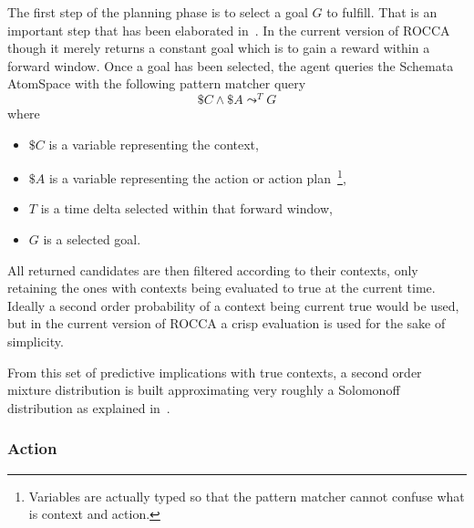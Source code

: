 \documentclass[runningheads]{llncs}
\newcommand{\lpreimp}[1]{\leadsto^{#1}}
\begin{document}
The first step of the planning phase is to select a goal $G$ to
fulfill.  That is an important step that has been elaborated
in~\cite{Goertzel2014EGI1, Hahm2021}.  In the current version of ROCCA
though it merely returns a constant goal which is to gain a reward
within a forward window.  Once a goal has been selected, the agent
queries the Schemata AtomSpace with the following pattern matcher
query
$$\$C \land \$A \lpreimp{T} G$$
where
\begin{itemize}
\item $\$C$ is a variable representing the context,
\item $\$A$ is a variable representing the action or action
  plan~\footnote{Variables are actually typed so that the pattern
    matcher cannot confuse what is context and action.},
\item $T$ is a time delta selected within that forward window,
\item $G$ is a selected goal.
\end{itemize}
All returned candidates are then filtered according to their contexts,
only retaining the ones with contexts being evaluated to true at the
current time.  Ideally a second order probability of a context being
current true would be used, but in the current version of ROCCA a
crisp evaluation is used for the sake of simplicity.

From this set of predictive implications with true contexts, a second
order mixture distribution is built approximating very roughly a
Solomonoff distribution as explained in~\cite{Geisweiller2018}.

\subsubsection{Action}
\end{document}
